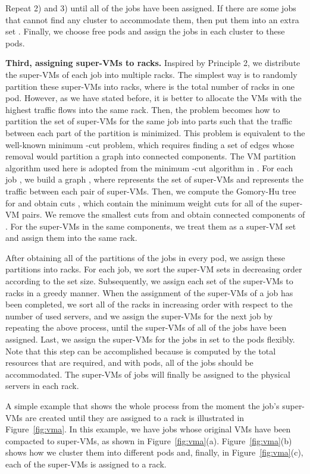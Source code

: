 \documentclass[journal,single-space,two column,twoside,10pt]{IEEEtran}
\begin{document}
Repeat 2) and 3) until all of the jobs have been assigned. If there are some jobs that cannot find any cluster to accommodate them, then put them into an extra set . Finally, we choose  free pods and assign the jobs in each cluster to these pods.

\textbf{Third, assigning super-VMs to racks.} Inspired by Principle 2, we distribute the super-VMs of each job into multiple racks. The simplest way is to randomly partition these super-VMs into  racks, where  is the total number of racks in one pod. However, as we have stated before, it is better to allocate the VMs with the highest traffic flows into the same rack. Then, the problem becomes how to partition the set of super-VMs for the same job into  parts such that the traffic between each part of the partition is minimized. This problem is equivalent to the well-known minimum -cut problem, which requires finding a set of edges whose removal would partition a graph into  connected components. The VM partition algorithm used here is adopted from the minimum -cut algorithm in \cite{Saran_Vazirani-1995}. For each job , we build a graph , where  represents the set of super-VMs and  represents the traffic between each pair of super-VMs. Then, we compute the Gomory-Hu tree for  and obtain  cuts , which contain the minimum weight cuts for all of the super-VM pairs. We remove the smallest  cuts from  and obtain  connected components of . For the super-VMs in the same components, we treat them as a super-VM set and assign them into the same rack.

After obtaining all of the partitions of the jobs in every pod, we assign these partitions into racks. For each job, we sort the super-VM sets in decreasing order according to the set size. Subsequently, we assign each set of the super-VMs to racks in a greedy manner. When the assignment of the super-VMs of a job has been completed, we sort all of the racks in increasing order with respect to the number of used servers, and we assign the super-VMs for the next job by repeating the above process, until the super-VMs of all of the jobs have been assigned. Last, we assign the super-VMs for the jobs in set  to the  pods flexibly. Note that this step can be accomplished because  is computed by the total resources that are required, and with  pods, all of the jobs should be accommodated. The super-VMs of jobs will finally be assigned to the physical servers in each rack.

A simple example that shows the whole process from the moment the job's super-VMs are created until they are assigned to a rack is illustrated in Figure~\ref{fig:vma}. In this example, we have  jobs whose original VMs have been compacted to  super-VMs, as shown in Figure~\ref{fig:vma}(a). Figure~\ref{fig:vma}(b) shows how we cluster them into different pods and, finally, in Figure~\ref{fig:vma}(c), each of the super-VMs is assigned to a rack.
\end{document}
